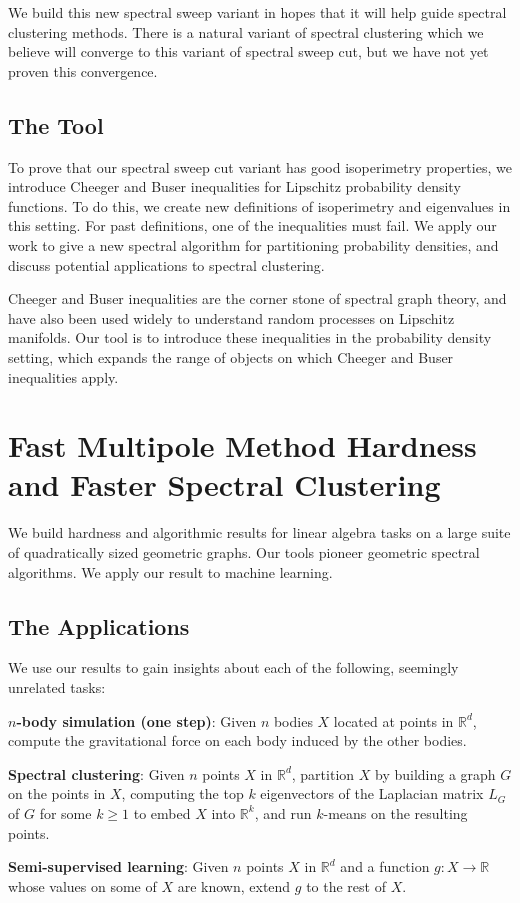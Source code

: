 We build this new spectral sweep variant in hopes that it will help
guide spectral clustering methods. There is a natural variant of
spectral clustering which we believe will converge to this variant of
spectral sweep cut, but we have not yet proven this convergence.

\subsection{The Tool}
To prove that our spectral sweep cut variant has good isoperimetry
properties, we introduce Cheeger and Buser inequalities for Lipschitz
probability density functions. To do this, we create new definitions of
isoperimetry and eigenvalues in this setting. For past
definitions, one of the inequalities must fail. We apply our work to
give a new spectral algorithm for partitioning probability densities,
and discuss potential applications to spectral clustering.

Cheeger and Buser inequalities are the corner stone of spectral graph
theory, and have also been used widely to understand random processes on
Lipschitz manifolds. Our tool is to introduce these inequalities in the
probability density setting, which expands the range of objects on which
Cheeger and Buser inequalities apply.

\section{Fast Multipole Method Hardness and Faster Spectral Clustering}
  We build hardness and algorithmic results for linear
  algebra tasks on a large suite of quadratically sized geometric
  graphs. Our tools pioneer geometric spectral algorithms. We apply our result to machine learning. 

\subsection{The Applications}
We use our results to gain insights about each of the following,
   seemingly unrelated tasks:

\vspace{1mm} \begin{tight_enumerate} \item \textbf{$n$-body simulation (one
    step)}: Given $n$ bodies $X$ located at points in $\mathbb{R}^d$,
  compute the gravitational force on each body induced by the other
  bodies.  \item \textbf{Spectral clustering}: Given $n$ points $X$ in
  $\mathbb{R}^d$, partition $X$ by building a graph $G$ on the points in
  $X$, computing the top $k$ eigenvectors of the Laplacian matrix $L_G$
  of $G$ for some $k\ge 1$ to embed $X$ into $\mathbb{R}^k$, and run
  $k$-means on the resulting points.  \item \textbf{Semi-supervised
    learning}: Given $n$ points $X$ in $\mathbb{R}^d$ and a function
    $g:X\rightarrow \mathbb{R}$ whose values on some of $X$ are known,
    extend $g$ to the rest of $X$.  \end{tight_enumerate}

